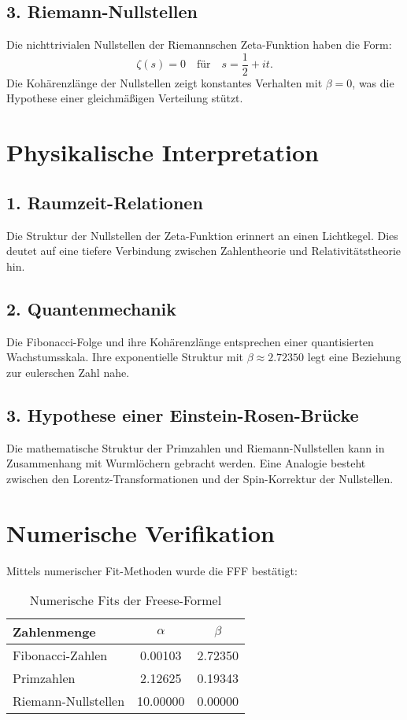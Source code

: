 \documentclass[a4paper,12pt]{article}
\begin{document}
\subsection{3. Riemann-Nullstellen}
Die nichttrivialen Nullstellen der Riemannschen Zeta-Funktion haben die Form:
\begin{equation}
\zeta(s) = 0 \quad \text{für} \quad s = \frac{1}{2} + i t.
\end{equation}
Die Kohärenzlänge der Nullstellen zeigt konstantes Verhalten mit $\beta = 0$, was die Hypothese einer gleichmäßigen Verteilung stützt.

\section{Physikalische Interpretation}
\subsection{1. Raumzeit-Relationen}
Die Struktur der Nullstellen der Zeta-Funktion erinnert an einen Lichtkegel. Dies deutet auf eine tiefere Verbindung zwischen Zahlentheorie und Relativitätstheorie hin.

\subsection{2. Quantenmechanik}
Die Fibonacci-Folge und ihre Kohärenzlänge entsprechen einer quantisierten Wachstumsskala. Ihre exponentielle Struktur mit $\beta \approx 2.72350$ legt eine Beziehung zur eulerschen Zahl nahe.

\subsection{3. Hypothese einer Einstein-Rosen-Brücke}
Die mathematische Struktur der Primzahlen und Riemann-Nullstellen kann in Zusammenhang mit Wurmlöchern gebracht werden. Eine Analogie besteht zwischen den Lorentz-Transformationen und der Spin-Korrektur der Nullstellen.

\section{Numerische Verifikation}
Mittels numerischer Fit-Methoden wurde die FFF bestätigt:
\begin{table}[h]
    \centering
    \begin{tabular}{lcc}
        \toprule
        Zahlenmenge & $\alpha$ & $\beta$ \\
        \midrule
        Fibonacci-Zahlen & 0.00103 & 2.72350 \\
        Primzahlen & 2.12625 & 0.19343 \\
        Riemann-Nullstellen & 10.00000 & 0.00000 \\
        \bottomrule
    \end{tabular}
    \caption{Numerische Fits der Freese-Formel}
\end{table}
\end{document}

